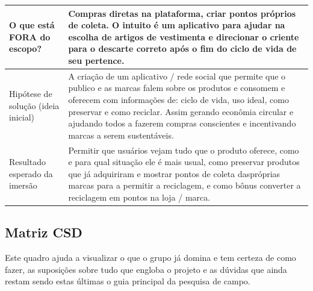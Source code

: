 \documentclass[12pt, a4paper]{article}
\begin{document}
\begin{xltabular}{\textwidth}{!{\color{oliveSoft}\vrule}>{\bfseries\color{oliveDeep}\raggedright\arraybackslash}p{4.1cm}!{\color{oliveSoft}\vrule}X!{\color{oliveSoft}\vrule}}
O que está FORA do escopo? & Compras diretas na plataforma, criar pontos próprios de coleta. O intuito é um aplicativo para ajudar na escolha de artigos de vestimenta e direcionar o criente para o descarte correto após o fim do ciclo de vida de seu pertence. \\ \hline
Hipótese de solução (ideia inicial) & A criação de um aplicativo / rede social que permite que o publico e as marcas falem sobre os produtos e consomem e oferecem com informações de: ciclo de vida, uso ideal, como preservar e como reciclar. Assim gerando econômia circular e ajudando todos a fazerem compras conscientes e incentivando marcas a serem sustentáveis. \\ \hline
Resultado esperado da imersão & Permitir que usuários vejam tudo que o produto oferece, como e para qual situação ele é mais usual, como preservar produtos que já adquiriram e mostrar pontos de coleta daspróprias marcas para a permitir a reciclagem, e como bônus converter a reciclagem em pontos na loja / marca. \\ \hline
\end{xltabular}
\endgroup

\subsection{Matriz CSD}
Este quadro ajuda a visualizar o que o grupo já domina e tem certeza de como fazer, as suposições sobre tudo que engloba o projeto e as dúvidas que ainda restam \textemdash{} sendo estas últimas o guia principal da pesquisa de campo.
\end{document}
